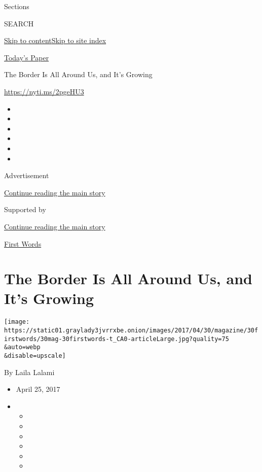 Sections

SEARCH

\protect\hyperlink{site-content}{Skip to
content}\protect\hyperlink{site-index}{Skip to site index}

\href{https://myaccount.nytimes3xbfgragh.onion/auth/login?response_type=cookie\&client_id=vi}{}

\href{https://www.nytimes3xbfgragh.onion/section/todayspaper}{Today's
Paper}

The Border Is All Around Us, and It's Growing

\url{https://nyti.ms/2pgeHU3}

\begin{itemize}
\item
\item
\item
\item
\item
\item
\end{itemize}

Advertisement

\protect\hyperlink{after-top}{Continue reading the main story}

Supported by

\protect\hyperlink{after-sponsor}{Continue reading the main story}

\href{/column/first-words}{First Words}

\hypertarget{the-border-is-all-around-us-and-its-growing}{%
\section{The Border Is All Around Us, and It's
Growing}\label{the-border-is-all-around-us-and-its-growing}}

\texttt{[image: https://static01.graylady3jvrrxbe.onion/images/2017/04/30/magazine/30firstwords/30mag-30firstwords-t\_CA0-articleLarge.jpg?quality=75\\\&auto=webp\\\&disable=upscale]}

By Laila Lalami

\begin{itemize}
\item
  April 25, 2017
\item
  \begin{itemize}
  \item
  \item
  \item
  \item
  \item
  \item
  \end{itemize}
\end{itemize}

